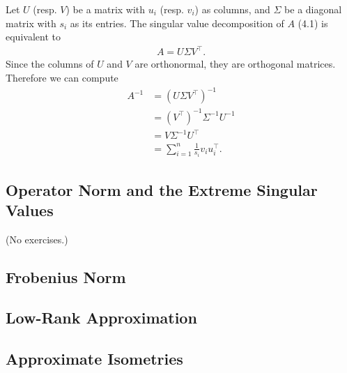 \documentclass{report}
\theoremstyle{definition}
\newenvironment{exercise}[1]{
  \renewcommand\theexerciseimpl{#1}
  \exerciseimpl
}{\endexerciseimpl}
\begin{document}
\begin{exercise}{4.1.1}
  Let $U$ (resp. $V$) be a matrix with $u_i$ (resp. $v_i$) as columns, and $\Sigma$ be a diagonal matrix with $s_i$ as its entries.
  The singular value decomposition of $A$ (4.1) is equivalent to
  \begin{align*}
    A = U \Sigma V^{\top}.
  \end{align*}
  Since the columns of $U$ and $V$ are orthonormal, they are orthogonal matrices.
  Therefore we can compute
  \begin{align*}
    A^{-1} & = (U \Sigma V^{\top})^{-1} \\
    & = (V^{\top})^{-1} \Sigma^{-1} U^{-1} \\
    & = V \Sigma^{-1} U^{\top} \\
    & = \sum_{i=1}^n \frac{1}{s_i} v_i u_i^{\top}.
  \end{align*}
\end{exercise}

\subsection{Operator Norm and the Extreme Singular Values}

(No exercises.)

\subsection{Frobenius Norm}

\begin{exercise}{4.1.2}
\end{exercise}

\subsection{Low-Rank Approximation}

\begin{exercise}{4.1.3}
\end{exercise}

\subsection{Approximate Isometries}
\end{document}
